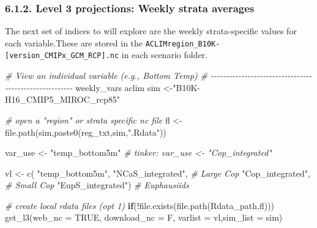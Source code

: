 \documentclass[
]{article}
\newenvironment{Shaded}{\begin{snugshade}}{\end{snugshade}}
\newcommand{\AttributeTok}[1]{\textcolor[rgb]{0.77,0.63,0.00}{#1}}
\newcommand{\CommentTok}[1]{\textcolor[rgb]{0.56,0.35,0.01}{\textit{#1}}}
\newcommand{\ConstantTok}[1]{\textcolor[rgb]{0.00,0.00,0.00}{#1}}
\newcommand{\ControlFlowTok}[1]{\textcolor[rgb]{0.13,0.29,0.53}{\textbf{#1}}}
\newcommand{\FunctionTok}[1]{\textcolor[rgb]{0.00,0.00,0.00}{#1}}
\newcommand{\NormalTok}[1]{#1}
\newcommand{\OtherTok}[1]{\textcolor[rgb]{0.56,0.35,0.01}{#1}}
\newcommand{\SpecialCharTok}[1]{\textcolor[rgb]{0.00,0.00,0.00}{#1}}
\newcommand{\StringTok}[1]{\textcolor[rgb]{0.31,0.60,0.02}{#1}}
\begin{document}
\hypertarget{level-3-projections-weekly-strata-averages}{%
\subsubsection{6.1.2. Level 3 projections: Weekly strata
averages}\label{level-3-projections-weekly-strata-averages}}

The next set of indices to will explore are the weekly strata-specific
values for each variable.These are stored in the
\texttt{ACLIMregion\_B10K-{[}version\_CMIPx\_GCM\_RCP{]}.nc} in each
scenario folder.

\begin{Shaded}
\begin{Highlighting}[]
    \CommentTok{\# View an individual variable (e.g., Bottom Temp)}
    \CommentTok{\# {-}{-}{-}{-}{-}{-}{-}{-}{-}{-}{-}{-}{-}{-}{-}{-}{-}{-}{-}{-}{-}{-}{-}{-}{-}{-}{-}{-}{-}{-}{-}{-}{-}{-}{-}{-}{-}{-}{-}{-}{-}{-}{-}{-}{-}{-}{-}{-}{-}{-}{-}{-}{-}{-}{-}}
\NormalTok{    weekly\_vars}
\NormalTok{    aclim}
\NormalTok{    sim        }\OtherTok{\textless{}{-}}\StringTok{"B10K{-}H16\_CMIP5\_MIROC\_rcp85"} 
    
    \CommentTok{\# open a "region" or strata specific nc file}
\NormalTok{    fl         }\OtherTok{\textless{}{-}} \FunctionTok{file.path}\NormalTok{(sim,}\FunctionTok{paste0}\NormalTok{(reg\_txt,sim,}\StringTok{".Rdata"}\NormalTok{))}
    
\NormalTok{    var\_use   }\OtherTok{\textless{}{-}} \StringTok{"temp\_bottom5m"}
    \CommentTok{\# tinker: var\_use \textless{}{-} "Cop\_integrated"}
    
\NormalTok{    vl        }\OtherTok{\textless{}{-}} \FunctionTok{c}\NormalTok{(}
                  \StringTok{"temp\_bottom5m"}\NormalTok{,}
                  \StringTok{"NCaS\_integrated"}\NormalTok{, }\CommentTok{\# Large Cop}
                  \StringTok{"Cop\_integrated"}\NormalTok{,  }\CommentTok{\# Small Cop}
                  \StringTok{"EupS\_integrated"}\NormalTok{) }\CommentTok{\# Euphausiids}
    
    \CommentTok{\# create local rdata files (opt 1)}
    \ControlFlowTok{if}\NormalTok{(}\SpecialCharTok{!}\FunctionTok{file.exists}\NormalTok{(}\FunctionTok{file.path}\NormalTok{(Rdata\_path,fl)))}
      \FunctionTok{get\_l3}\NormalTok{(}\AttributeTok{web\_nc =} \ConstantTok{TRUE}\NormalTok{, }\AttributeTok{download\_nc =}\NormalTok{ F,}
          \AttributeTok{varlist =}\NormalTok{ vl,}\AttributeTok{sim\_list =}\NormalTok{ sim)}
    

\end{Highlighting}
\end{Shaded}
\end{document}
